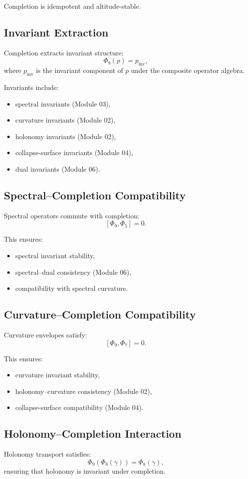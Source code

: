Completion is idempotent and altitude-stable.

\subsection{Invariant Extraction}
Completion extracts invariant structure:
\[
\Phi_9(p) = p_{\mathrm{inv}},
\]
where $p_{\mathrm{inv}}$ is the invariant component of $p$ under the composite
operator algebra.

Invariants include:
\begin{itemize}
    \item spectral invariants (Module 03),
    \item curvature invariants (Module 02),
    \item holonomy invariants (Module 02),
    \item collapse-surface invariants (Module 04),
    \item dual invariants (Module 06).
\end{itemize}

\subsection{Spectral–Completion Compatibility}
Spectral operators commute with completion:
\[
[\Phi_9, \Phi_5] = 0.
\]

This ensures:
\begin{itemize}
    \item spectral invariant stability,
    \item spectral–dual consistency (Module 06),
    \item compatibility with spectral curvature.
\end{itemize}

\subsection{Curvature–Completion Compatibility}
Curvature envelopes satisfy:
\[
[\Phi_9, \Phi_7] = 0.
\]

This ensures:
\begin{itemize}
    \item curvature invariant stability,
    \item holonomy–curvature consistency (Module 02),
    \item collapse-surface compatibility (Module 04).
\end{itemize}

\subsection{Holonomy–Completion Interaction}
Holonomy transport satisfies:
\[
\Phi_9(\Phi_8(\gamma)) = \Phi_8(\gamma),
\]
ensuring that holonomy is invariant under completion.

